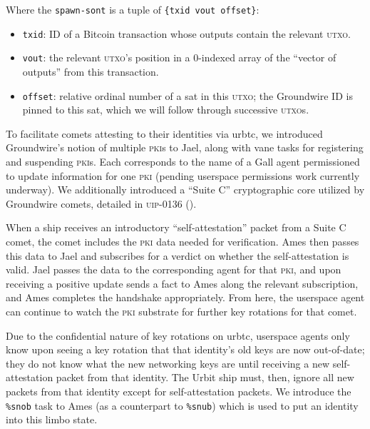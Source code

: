 \documentclass[twoside]{article}
\begin{document}
Where the \texttt{spawn-sont} is a tuple of \texttt{\{txid\ vout\ offset\}}:

\begin{itemize}[noitemsep,topsep=2pt]

\item
  \texttt{txid}: ID of a Bitcoin transaction whose outputs contain
  the relevant \textsc{utxo}.
\item
  \texttt{vout}: the relevant \textsc{utxo}'s position in a 0-indexed array of
  the ``vector of outputs'' from this transaction.
\item
  \texttt{offset}: relative ordinal number of a sat in this \textsc{utxo}; the
  Groundwire ID is pinned to this sat, which we will follow through
  successive \textsc{utxo}s.
\end{itemize}

To facilitate comets attesting to their identities via urbtc, we
introduced Groundwire's notion of multiple \textsc{pki}s to Jael, along with vane
tasks for registering and suspending \textsc{pki}s. Each corresponds to the name
of a Gall agent permissioned to update information for one \textsc{pki} (pending
userspace permissions work currently underway). We additionally
introduced a ``Suite C'' cryptographic core utilized by Groundwire
comets, detailed in \textsc{uip}-0136 (\citeyear{UIP-0136}).

When a ship receives an introductory ``self-attestation'' packet from a
Suite C comet, the comet includes the \textsc{pki} data needed for verification.
Ames then passes this data to Jael and subscribes for a verdict on
whether the self-attestation is valid. Jael passes the data to the
corresponding agent for that \textsc{pki}, and upon receiving a positive update
sends a fact to Ames along the relevant subscription,
and Ames completes the handshake appropriately. From here, the userspace
agent can continue to watch the \textsc{pki} substrate for further key rotations
for that comet.

Due to the confidential nature of key rotations on urbtc, userspace
agents only know upon seeing a key rotation that that identity's old
keys are now out-of-date; they do not know what the new networking
keys are until receiving a new self-attestation packet from that
identity. The Urbit ship must, then, ignore all new packets from that
identity except for self-attestation packets. We introduce the
\texttt{\%snob} task to Ames (as a counterpart to \texttt{\%snub}) which
is used to put an identity into this limbo state.
\end{document}
